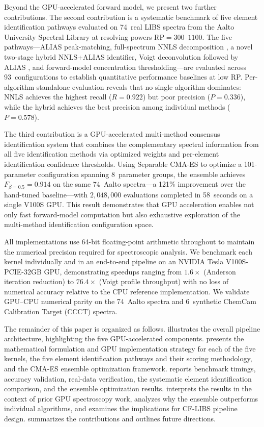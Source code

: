 Beyond the GPU-accelerated forward model, we present two further contributions.
The second contribution is a systematic benchmark of five element identification pathways evaluated on 74~real LIBS spectra from the Aalto University Spectral Library \citep{Drozdovskiy2020} at resolving powers $\mathrm{RP} = 300$--$1100$.
The five pathways---ALIAS peak-matching, full-spectrum NNLS decomposition \citep{Lawson1974}, a novel two-stage hybrid NNLS+ALIAS identifier, Voigt deconvolution followed by ALIAS \citep{AlJalali2016,Dai2026}, and forward-model concentration thresholding---are evaluated across 93~configurations to establish quantitative performance baselines at low RP.
Per-algorithm standalone evaluation reveals that no single algorithm dominates: NNLS achieves the highest recall ($R = 0.922$) but poor precision ($P = 0.336$), while the hybrid achieves the best precision among individual methods ($P = 0.578$).

The third contribution is a GPU-accelerated multi-method consensus identification system that combines the complementary spectral information from all five identification methods via optimized weights and per-element identification confidence thresholds.
Using Separable CMA-ES \citep{Hansen2001,Ros2008} to optimize a 101-parameter configuration spanning 8~parameter groups, the ensemble achieves $F_{\beta=0.5} = 0.914$ on the same 74~Aalto spectra---a 121\% improvement over the hand-tuned baseline---with $2{,}048{,}000$ evaluations completed in 58~seconds on a single V100S GPU.
This result demonstrates that GPU acceleration enables not only fast forward-model computation but also exhaustive exploration of the multi-method identification configuration space.

All implementations use 64-bit floating-point arithmetic throughout to maintain the numerical precision required for spectroscopic analysis.
We benchmark each kernel individually and in an end-to-end pipeline on an NVIDIA Tesla V100S-PCIE-32GB GPU, demonstrating speedups ranging from $1.6\times$ (Anderson iteration reduction) to $76.4\times$ (Voigt profile throughput) with no loss of numerical accuracy relative to the CPU reference implementation.
We validate GPU--CPU numerical parity on the 74~Aalto spectra and 6~synthetic ChemCam Calibration Target (CCCT) spectra.

The remainder of this paper is organized as follows.
 illustrates the overall pipeline architecture, highlighting the five GPU-accelerated components.
 presents the mathematical formulation and GPU implementation strategy for each of the five kernels, the five element identification pathways and their scoring methodology, and the CMA-ES ensemble optimization framework.
 reports benchmark timings, accuracy validation, real-data verification, the systematic element identification comparison, and the ensemble optimization results.
 interprets the results in the context of prior GPU spectroscopy work, analyzes why the ensemble outperforms individual algorithms, and examines the implications for CF-LIBS pipeline design.
 summarizes the contributions and outlines future directions.

